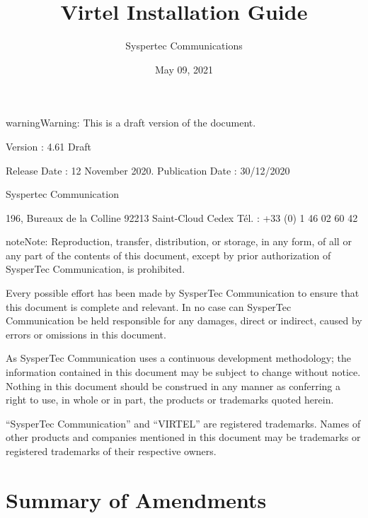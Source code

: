 \documentclass[letterpaper,10pt,english]{sphinxmanual}
\title{Virtel Installation Guide}
\date{May 09, 2021}
\author{Syspertec Communications}
\begin{document}
\pagestyle{empty}
\sphinxmaketitle
\pagestyle{plain}
\sphinxtableofcontents
\pagestyle{normal}
\label{\detokenize{Installation_Guide::doc}}




\begin{sphinxadmonition}{warning}{Warning:}
This is a draft version of the document.
\end{sphinxadmonition}

Version : 4.61 Draft

Release Date : 12 November 2020. Publication Date : 30/12/2020

Syspertec Communication

196, Bureaux de la Colline 92213 Saint-Cloud Cedex Tél. : +33 (0) 1 46 02 60 42


\begin{sphinxadmonition}{note}{Note:}
Reproduction, transfer, distribution, or storage, in any form, of all or any part of
the contents of this document, except by prior authorization of SysperTec
Communication, is prohibited.

Every possible effort has been made by SysperTec Communication to ensure that this document
is complete and relevant. In no case can SysperTec Communication be held responsible for
any damages, direct or indirect, caused by errors or omissions in this document.

As SysperTec Communication uses a continuous development methodology; the information
contained in this document may be subject to change without notice. Nothing in this
document should be construed in any manner as conferring a right to use, in whole or in
part, the products or trademarks quoted herein.

“SysperTec Communication” and “VIRTEL” are registered trademarks. Names of other products
and companies mentioned in this document may be trademarks or registered trademarks of
their respective owners.
\end{sphinxadmonition}

\newpage


\chapter{Summary of Amendments}
\label{\detokenize{Installation_Guide:summary-of-amendments}}\label{\detokenize{Installation_Guide:vvrrig60-summary-of-ammendments}}
\end{document}
